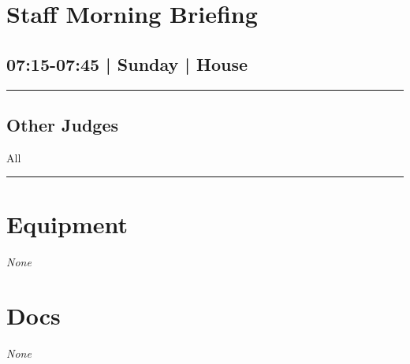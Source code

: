 \documentclass[10pt, A5]{article}
\begin{document}
        \begin{framed}
        \begin{minipage}{\textwidth}

        \setcounter{section}{56}
        \section{Staff Morning Briefing}
        \subsection*{07:15-07:45 | Sunday | House}

        \vspace{0.25cm}
        \hrule
        \vspace{0.25cm}


        \subsection*{Other Judges}
                    All

            \vspace{0.25cm}
        \hrule
        \vspace{0.25cm}

        \begin{multicols}{2}

		\section*{\faWrench \: Equipment}

				\textit{None}
		
		\vfill\null
		\columnbreak

			\section*{\faFile \: Docs}
		 	\textit{None}
	

		\vfill\null

		\end{multicols}
\end{minipage}
\end{framed}
\end{document}

